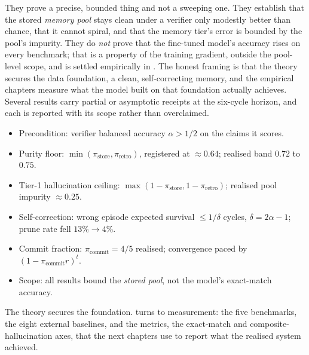 \begin{defence}
They prove a precise, bounded thing and not a sweeping one. They establish that the stored
\emph{memory pool} stays clean under a verifier only modestly better than chance, that it
cannot spiral, and that the memory tier's error is bounded by the pool's impurity. They do
\emph{not} prove that the fine-tuned model's accuracy rises on every benchmark; that is a
property of the training gradient, outside the pool-level scope, and is settled empirically
in . The honest framing is that the theory secures the data foundation,
a clean, self-correcting memory, and the empirical chapters measure what the model built on
that foundation actually achieves. Several results carry partial or asymptotic receipts at
the six-cycle horizon, and each is reported with its scope rather than overclaimed.
\end{defence}

\begin{bythenumbers}
\begin{itemize}[leftmargin=1.3em, itemsep=1pt]
  \item Precondition: verifier balanced accuracy $\alpha > 1/2$ on the claims it scores.
  \item Purity floor: $\min(\pi_{\text{store}}, \pi_{\text{retro}})$, registered at $\approx 0.64$; realised band $0.72$ to $0.75$.
  \item Tier-1 hallucination ceiling: $\max(1-\pi_{\text{store}}, 1-\pi_{\text{retro}})$; realised pool impurity $\approx 0.25$.
  \item Self-correction: wrong episode expected survival $\le 1/\delta$ cycles, $\delta = 2\alpha - 1$; prune rate fell $13\% \to 4\%$.
  \item Commit fraction: $\pi_{\text{commit}} = 4/5$ realised; convergence paced by $(1-\pi_{\text{commit}} r)^t$.
  \item Scope: all results bound the \emph{stored pool}, not the model's exact-match accuracy.
\end{itemize}
\end{bythenumbers}

The theory secures the foundation.  turns to measurement: the five
benchmarks, the eight external baselines, and the metrics, the exact-match and
composite-hallucination axes, that the next chapters use to report what the realised system
achieved.
